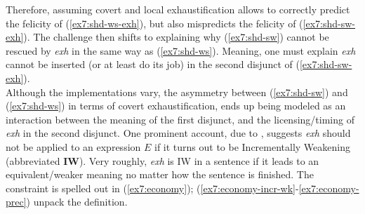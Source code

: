 Therefore, assuming covert and local exhaustification allows to correctly predict the felicity of (\ref{ex7:shd-ws-exh}), but also mispredicts the felicity of (\ref{ex7:shd-sw-exh}). The challenge then shifts to explaining why (\ref{ex7:shd-sw}) cannot be rescued by \textit{exh} in the same way as (\ref{ex7:shd-ws}). Meaning, one must explain \textit{exh} cannot be inserted (or at least do its job) in the second disjunct of (\ref{ex7:shd-sw-exh}).\\

Although the implementations vary, the asymmetry between (\ref{ex7:shd-sw}) and (\ref{ex7:shd-ws}) in terms of covert exhaustification, ends up being modeled as an interaction between the meaning of the first disjunct, and the licensing/timing of \textit{exh} in the second disjunct. One prominent account, due to \citet{Fox2018}, suggests \textit{exh} should not be applied to an expression $E$ if it turns out to be Incrementally Weakening (abbreviated \textbf{IW}). Very roughly, \textit{exh} is IW in a sentence if it leads to an equivalent/weaker meaning no matter how the sentence is finished. The constraint is spelled out in (\ref{ex7:economy}); (\ref{ex7:economy-incr-wk}-\ref{ex7:economy-prec}) unpack the definition.

